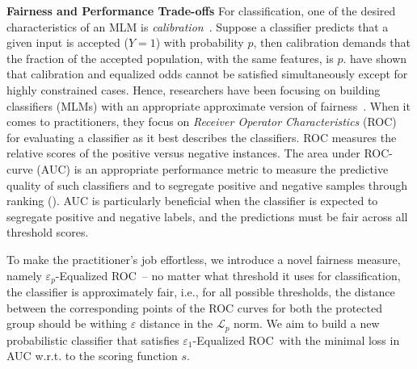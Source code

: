\documentclass{article}
\newcommand{\ourdef}{-Equalized ROC}
\begin{document}
\noindent\textbf{Fairness and Performance Trade-offs} For classification, one of the desired characteristics of an MLM is \emph{calibration}~\cite{kleinberg17}. Suppose a classifier predicts that a given input is accepted ($Y=1$) with probability $p$, then calibration demands that the fraction of the accepted population, with the same features, is $p$. \cite{kleinberg17,chouldechova17} have shown that calibration and equalized odds cannot be satisfied simultaneously except for highly constrained cases. Hence, researchers have been focusing on building classifiers (MLMs) with an appropriate approximate version of fairness~\cite{madras2018learning}. 
When it comes to practitioners, they focus on \emph{Receiver Operator Characteristics} (ROC) for evaluating a classifier as it best describes the classifiers. ROC measures the relative scores of the positive versus negative instances. The area under ROC-curve (AUC) is an appropriate performance metric to measure the predictive quality of such classifiers and to segregate positive and negative samples through ranking (\cite{huang05,clemencon08,zehlike21}). AUC is particularly beneficial when the classifier is expected to segregate positive and negative labels, and the predictions must be fair across all threshold scores.

To make the practitioner's job effortless, we introduce a novel fairness measure, namely $\varepsilon_p$\ourdef\ -- no matter what threshold it uses for classification, the classifier is approximately fair, i.e., for all possible thresholds, the distance between the corresponding points of the ROC curves for both the protected group should be withing $\varepsilon$ distance in the $\mathcal{L}_p$ norm.
We aim to build a new probabilistic classifier that satisfies $\varepsilon_1$\ourdef\ with the minimal loss in AUC w.r.t. to the scoring function $s$.
\end{document}

